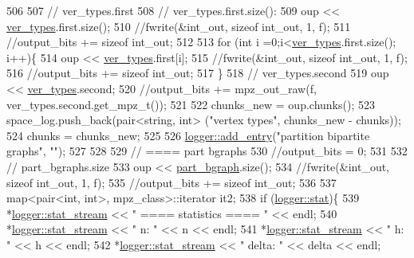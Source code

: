 \begin{DoxyCode}
506 
507   \textcolor{comment}{// ver\_types.first}
508   \textcolor{comment}{// ver\_types.first.size():}
509   oup << \hyperlink{classmarked__graph__compressed_af446cc5e23c241a92b76642fd5ebc403}{ver\_types}.first.size();
510   \textcolor{comment}{//fwrite(&int\_out, sizeof int\_out, 1, f);}
511   \textcolor{comment}{//output\_bits += sizeof int\_out;}
512 
513   \textcolor{keywordflow}{for} (\textcolor{keywordtype}{int} i =0;i<\hyperlink{classmarked__graph__compressed_af446cc5e23c241a92b76642fd5ebc403}{ver\_types}.first.size(); i++)\{
514     oup <<  \hyperlink{classmarked__graph__compressed_af446cc5e23c241a92b76642fd5ebc403}{ver\_types}.first[i];
515     \textcolor{comment}{//fwrite(&int\_out, sizeof int\_out, 1, f);}
516     \textcolor{comment}{//output\_bits += sizeof int\_out;}
517   \}
518   \textcolor{comment}{// ver\_types.second}
519   oup << \hyperlink{classmarked__graph__compressed_af446cc5e23c241a92b76642fd5ebc403}{ver\_types}.second;
520   \textcolor{comment}{//output\_bits += mpz\_out\_raw(f, ver\_types.second.get\_mpz\_t());}
521 
522   chunks\_new = oup.chunks();
523   space\_log.push\_back(pair<string, int> (\textcolor{stringliteral}{"vertex types"}, chunks\_new - chunks));
524   chunks = chunks\_new;
525 
526   \hyperlink{classlogger_a710163deb17bc81f70d53d285b8ac9ac}{logger::add\_entry}(\textcolor{stringliteral}{"partition bipartite graphs"}, \textcolor{stringliteral}{""});
527   
528 
529   \textcolor{comment}{// ==== part bgraphs}
530   \textcolor{comment}{//output\_bits = 0;}
531 
532   \textcolor{comment}{// part\_bgraphs.size}
533   oup << \hyperlink{classmarked__graph__compressed_a7b3267063fba30b45eb21b3ba4e07536}{part\_bgraph}.size();
534   \textcolor{comment}{//fwrite(&int\_out, sizeof int\_out, 1, f);}
535   \textcolor{comment}{//output\_bits += sizeof int\_out;}
536 
537   map<pair<int, int>, mpz\_class>::iterator it2;
538   \textcolor{keywordflow}{if} (\hyperlink{classlogger_a26812b5ba03f130e8dae3446d5fc032f}{logger::stat})\{
539     *\hyperlink{classlogger_a7db37821f875f2ba3540980b355779f5}{logger::stat\_stream} << \textcolor{stringliteral}{" ==== statistics ==== "} << endl;
540     *\hyperlink{classlogger_a7db37821f875f2ba3540980b355779f5}{logger::stat\_stream} << \textcolor{stringliteral}{" n:                "} << n << endl;
541     *\hyperlink{classlogger_a7db37821f875f2ba3540980b355779f5}{logger::stat\_stream} << \textcolor{stringliteral}{" h:                "} << h << endl;
542     *\hyperlink{classlogger_a7db37821f875f2ba3540980b355779f5}{logger::stat\_stream} << \textcolor{stringliteral}{" delta:            "} << delta << endl;

\end{DoxyCode}
